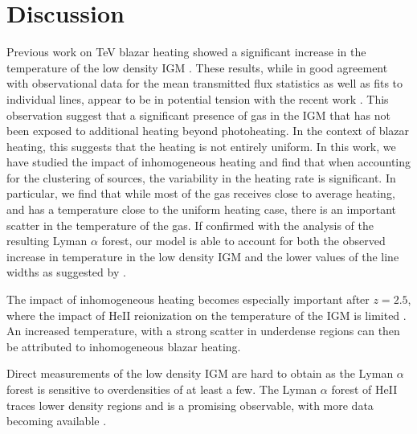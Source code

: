 \documentclass[numberedappendix]{emulateapj}
\begin{document}
{\section{Discussion}
Previous work on TeV blazar heating showed a significant increase in the temperature of the low density IGM \citep{2012ApJ...752...23C,2012MNRAS.423..149P}. These results, while in good agreement with observational data for the mean transmitted flux statistics as well as fits to individual lines, appear to be in potential tension with the recent work \citep{2012ApJ...757L..30R}. This observation suggest that a significant presence of gas in the IGM that has not been exposed to additional heating beyond photoheating. In the context of blazar heating, this suggests that the heating is not entirely uniform. In this work, we have studied the impact of inhomogeneous heating and find that when accounting for the clustering of sources, the variability in the heating rate is significant. In particular, we find that while most of the gas receives close to average heating, and has a temperature close to the uniform heating case, there is an important scatter in the temperature of the gas. If confirmed with the analysis of the resulting Lyman $\alpha$ forest, our model is able to account for both the observed increase in temperature in the low density IGM \citep{2014MNRAS.441.1916B,2009MNRAS.399L..39V} and the lower values of the line widths as suggested by \citet{2012ApJ...757L..30R}.

The impact of inhomogeneous heating becomes especially important after $z=2.5$, where the impact of HeII reionization on the temperature of the IGM is limited \citep{2013MNRAS.435.3169C}. An increased temperature, with a strong scatter in underdense regions can then be attributed to inhomogeneous blazar heating. 

Direct measurements of the low density IGM are hard to obtain as the Lyman $\alpha$ forest is sensitive to overdensities of at least a few. The Lyman $\alpha$ forest of HeII traces lower density regions and is a promising observable, with more data becoming available \citep{2014arXiv1405.7405W}.


}
\end{document}
